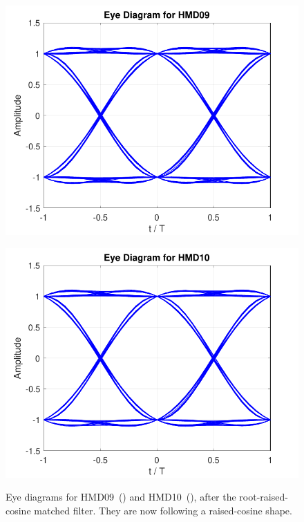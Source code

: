	\begin{figure}[H]
	\centering
	\begin{minipage}{0.45\textwidth}
		\centering
		\includegraphics[width=1\textwidth]		
		{./sdf/m_qam_system/figures/simulations/01_noISI/HMD09_ed.pdf}
		\subcaption{}\label{fig:ISIhmd09ed}
	\end{minipage}
	\begin{minipage}{0.45\textwidth}
		\centering
		\includegraphics[width=1\textwidth]
		{sdf/m_qam_system/figures/simulations/01_noISI/HMD10_ed.pdf}
		\subcaption{}\label{fig:ISIhmd10ed}
	\end{minipage}
	\caption{Eye diagrams for HMD09~() and 
		HMD10~(), after the root-raised-cosine matched 
		filter. They are now following a raised-cosine 
		shape.}\label{fig:ISIhmd0910ed}
\end{figure}

